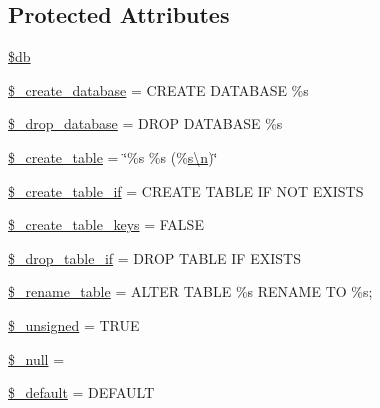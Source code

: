 \subsection*{Protected Attributes}
\begin{DoxyCompactItemize}
\item 
\hyperlink{class_c_i___d_b__forge_a1fa3127fc82f96b1436d871ef02be319}{\$db}
\item 
\hyperlink{class_c_i___d_b__forge_acd23c9a8735806155f1a5d0a87c151f2}{\$\+\_\+create\+\_\+database} = \textquotesingle{}C\+R\+E\+A\+T\+E D\+A\+T\+A\+B\+A\+S\+E \%s\textquotesingle{}
\item 
\hyperlink{class_c_i___d_b__forge_a8305b12fc17f6f87778260ebdff287b4}{\$\+\_\+drop\+\_\+database} = \textquotesingle{}D\+R\+O\+P D\+A\+T\+A\+B\+A\+S\+E \%s\textquotesingle{}
\item 
\hyperlink{class_c_i___d_b__forge_a5950510a854f546e14f781b079a0a2b0}{\$\+\_\+create\+\_\+table} = \char`\"{}\%s \%s (\%\hyperlink{cli_2error__general_8php_ace0fd03cd383f20ce6ea63247a207294}{s\textbackslash{}n})\char`\"{}
\item 
\hyperlink{class_c_i___d_b__forge_a2f6484fcb8d1dc3eef67a637227cd583}{\$\+\_\+create\+\_\+table\+\_\+if} = \textquotesingle{}C\+R\+E\+A\+T\+E T\+A\+B\+L\+E I\+F N\+O\+T E\+X\+I\+S\+T\+S\textquotesingle{}
\item 
\hyperlink{class_c_i___d_b__forge_a73e07acdd35c948ad353903c2827af6e}{\$\+\_\+create\+\_\+table\+\_\+keys} = F\+A\+L\+S\+E
\item 
\hyperlink{class_c_i___d_b__forge_a92a8a9145a7fc91e252e58d019373581}{\$\+\_\+drop\+\_\+table\+\_\+if} = \textquotesingle{}D\+R\+O\+P T\+A\+B\+L\+E I\+F E\+X\+I\+S\+T\+S\textquotesingle{}
\item 
\hyperlink{class_c_i___d_b__forge_a1a649e7cf9de16bcf932977b18bc91de}{\$\+\_\+rename\+\_\+table} = \textquotesingle{}A\+L\+T\+E\+R T\+A\+B\+L\+E \%s R\+E\+N\+A\+M\+E T\+O \%s;\textquotesingle{}
\item 
\hyperlink{class_c_i___d_b__forge_aae977ae6d61fa183f0b25422b6ddc31c}{\$\+\_\+unsigned} = T\+R\+U\+E
\item 
\hyperlink{class_c_i___d_b__forge_ae58fe6a5104d4a069a49b27533ce808f}{\$\+\_\+null} = \textquotesingle{}\textquotesingle{}
\item 
\hyperlink{class_c_i___d_b__forge_aa119e1b4e3d00f47a7b83b7066087915}{\$\+\_\+default} = \textquotesingle{} D\+E\+F\+A\+U\+L\+T \textquotesingle{}
\end{DoxyCompactItemize}


